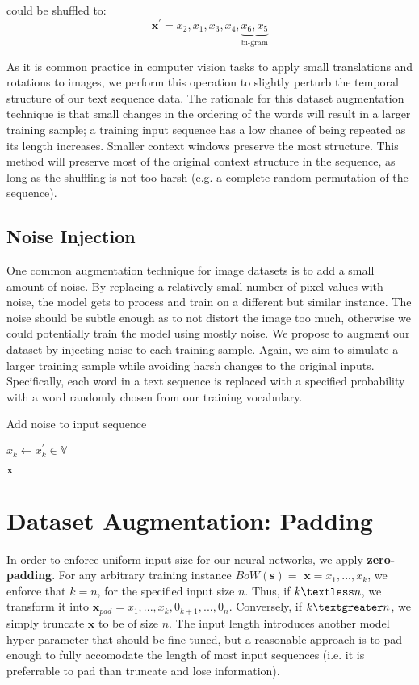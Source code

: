  could be shuffled to:
\[\bm{x}^{\prime} = x_2, x_1, x_3, x_4, \underbrace{x_6, x_5}_\text{bi-gram}\]

As it is common practice in computer vision tasks to apply small translations and rotations to images, we perform
this operation to slightly perturb the temporal structure of our text sequence data.
The rationale for this dataset augmentation technique is that small changes in the ordering of the words will
result in a larger training sample; a training input sequence has a low chance of being repeated as its
length increases. Smaller context windows preserve the most structure. This method will preserve
most of the original context structure in the sequence, as long as the shuffling is not too harsh (e.g.
a complete random permutation of the sequence).

\subsection{Noise Injection}
One common augmentation technique for image datasets is to add a small amount of noise. By replacing a relatively small
number of pixel values with noise, the model gets to process and train on a different but similar instance. The noise should be subtle
enough as to not distort the image too much, otherwise we could potentially train the model using mostly noise.
We propose to augment our dataset by injecting noise to each training sample. Again, we aim to simulate
a larger training sample while avoiding harsh changes to the original inputs. Specifically, each word in a text sequence is replaced
with a specified probability with a word randomly chosen from our training vocabulary.
\begin{algorithm}[H]
\caption{Add noise to input sequence}
\begin{algorithmic}[1]
\State$x_k \gets x^{\prime}_k \in \mathbb{V}$
\EndIf
\EndFor

\Return $\bm{x}$
\EndProcedure
\end{algorithmic}
\end{algorithm}


\section{Dataset Augmentation: Padding}
In order to enforce uniform input size for our neural networks,
we apply \textbf{zero-padding}. For any arbitrary training instance $BoW(\bm{s})=$ $\bm{x} = x_1,...,x_k$, we enforce that $k = n$, for the specified input size
$n$. Thus, if $k \textless n$, we transform it into $\bm{x}_{pad} = x_1,...,x_k, 0_{k+1}, ..., 0_{n}$. Conversely, if
$k \textgreater n$, we simply truncate $\bm{x}$ to be of size $n$. The input length introduces another model hyper-parameter
that should be fine-tuned, but a reasonable approach is to pad enough to fully accomodate
the length of most input sequences (i.e. it is preferrable to pad than truncate and lose
information).

